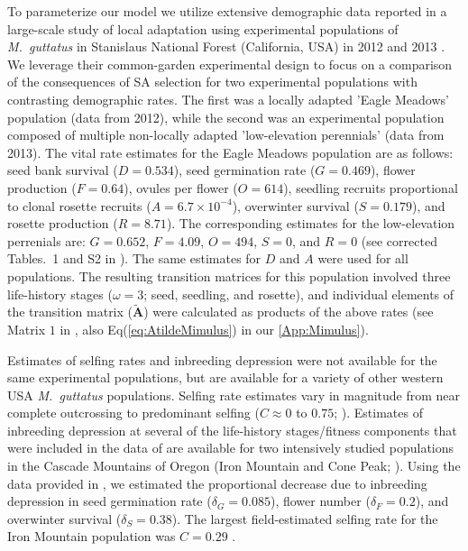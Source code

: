 \documentclass[11pt]{article}
\def\mbf#1{\mathbf{#1}}
\begin{document}
To parameterize our model we utilize extensive demographic data reported in a large-scale study of local adaptation using experimental populations of {\itshape M.~guttatus} in Stanislaus National Forest (California, USA) in 2012 and 2013 \citep{PetersonEtAl2016}. We leverage their common-garden experimental design to focus on a comparison of the consequences of SA selection for two experimental populations with contrasting demographic rates. The first was a locally adapted 'Eagle Meadows' population (data from 2012), while the second was an experimental population composed of multiple non-locally adapted 'low-elevation perennials' (data from 2013). The vital rate estimates for the Eagle Meadows population are as follows: seed bank survival ($D = 0.534$), seed germination rate ($G = 0.469$), flower production ($F = 0.64$), ovules per flower ($O = 614$), seedling recruits proportional to clonal rosette recruits ($A = 6.7 \times 10^{-4}$), overwinter survival ($S = 0.179$), and rosette production ($R = 8.71$). The corresponding estimates for the low-elevation perrenials are: $G = 0.652$, $F = 4.09$, $O = 494$, $S = 0$, and $R = 0$ (see corrected Tables.~1 and S2 in \citealt{PetersonEtAl2017}). The same estimates for $D$ and $A$ were used for all populations. The resulting transition matrices for this population involved three life-history stages ($\omega = 3$; seed, seedling, and rosette), and individual elements of the transition matrix ($\tilde{\mbf{A}}$) were calculated as products of the above rates (see Matrix $1$ in \citealt{PetersonEtAl2016}, also Eq(\ref{eq:AtildeMimulus}) in our \ref{App:Mimulus}).

Estimates of selfing rates and inbreeding depression were not available for the same experimental populations, but are available for a variety of other western USA {\itshape M.~guttatus} populations. Selfing rate estimates vary in magnitude from near complete outcrossing to predominant selfing ($C \approx 0$ to $0.75$; \citealt{RitlandGanders1987, Ritland1990, Willis1999b}). Estimates of inbreeding depression at several of the life-history stages/fitness components that were included in the data of \citet{PetersonEtAl2016} are available for two intensively studied populations in the Cascade Mountains of Oregon (Iron Mountain and Cone Peak; \citealt{Willis1993, Willis1999a, Willis1999b}). Using the data provided in \citet{Willis1993}, we estimated the proportional decrease due to inbreeding depression in seed germination rate ($\delta_{G} = 0.085$), flower number ($\delta_{F} = 0.2$), and overwinter survival ($\delta_{S} = 0.38$). The largest field-estimated selfing rate for the Iron Mountain population was $C = 0.29$ \citep{Willis1993}.
\end{document}
